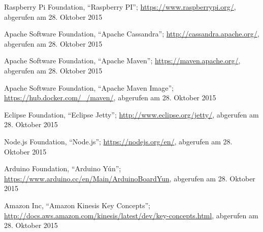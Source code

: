 \begin{thebibliography}{1}
Raspberry Pi Foundation, ``Raspberry PI''; \url{https://www.raspberrypi.org/}, abgerufen am 28. Oktober 2015

Apache Software Foundation, ``Apache Cassandra''; \url{http://cassandra.apache.org/}, abgerufen am 28. Oktober 2015

Apache Software Foundation, ``Apache Maven''; \url{https://maven.apache.org/}, abgerufen am 28. Oktober 2015

Apache Software Foundation, ``Apache Maven Image''; \url{https://hub.docker.com/_/maven/}, abgerufen am 28. Oktober 2015

Eclipse Foundation, ``Eclipse Jetty''; \url{http://www.eclipse.org/jetty/}, abgerufen am 28. Oktober 2015

Node.js Foundation, ``Node.js''; \url{https://nodejs.org/en/}, abgerufen am 28. Oktober 2015

Arduino Foundation, ``Arduino Yún''; \url{https://www.arduino.cc/en/Main/ArduinoBoardYun}, abgerufen am 28. Oktober 2015

Amazon Inc, ``Amazon Kinesis Key Concepts'';  \url{http://docs.aws.amazon.com/kinesis/latest/dev/key-concepts.html}, abgerufen am 28. Oktober 2015

\end{thebibliography}
